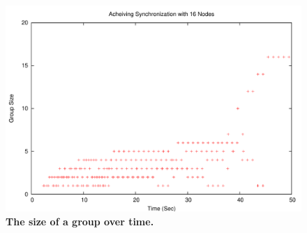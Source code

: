 \begin{figure}[t]
\begin{center}
\includegraphics[width=1.0\hsize]{./figures/11-Jan-2005-1-16MOTES-150CONSTANT-RING-EVENT-ALL-GROUPS.pdf}
\end{center}
\caption{{\small {\bf The size of a group over time.}}}
\label{fig:lgp}
\end{figure}